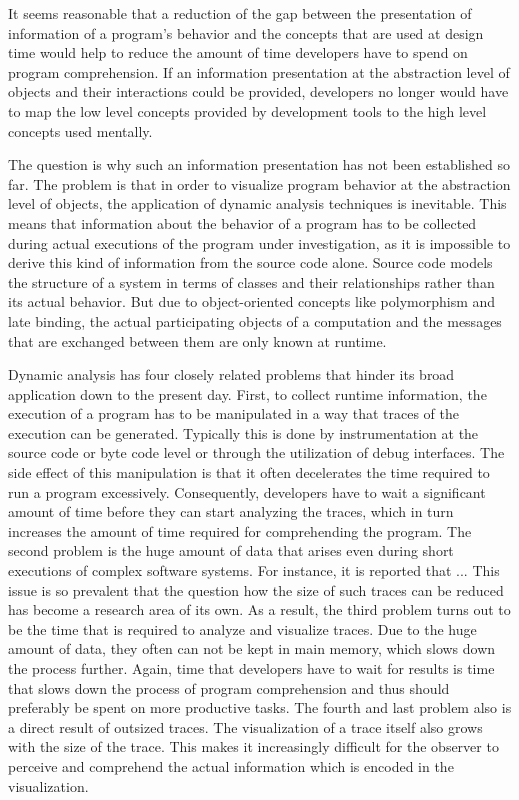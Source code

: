 It seems reasonable that a reduction of the gap between the presentation of information of a program's behavior and the concepts that are used at design time would help to reduce the amount of time developers have to spend on program comprehension.
If an information presentation at the abstraction level of objects and their interactions could be provided, developers no longer would have to map the low level concepts provided by development tools to the high level concepts used mentally.

The question is why such an information presentation has not been established so far.
The problem is that in order to visualize program behavior at the abstraction level of objects, the application of dynamic analysis techniques is inevitable.
This means that information about the behavior of a program has to be collected during actual executions of the program under investigation, as it is impossible to derive this kind of information from the source code alone.
Source code models the structure of a system in terms of classes and their relationships rather than its actual behavior.
But due to object-oriented concepts like polymorphism and late binding, the actual participating objects of a computation and the messages that are exchanged between them are only known at runtime.

Dynamic analysis has four closely related problems that hinder its broad application down to the present day.
First, to collect runtime information, the execution of a program has to be manipulated in a way that traces of the execution can be generated.
Typically this is done by instrumentation at the source code or byte code level or through the utilization of debug interfaces.
The side effect of this manipulation is that it often decelerates the time required to run a program excessively.
Consequently, developers have to wait a significant amount of time before they can start analyzing the traces, which in turn increases the amount of time required for comprehending the program.
The second problem is the huge amount of data that arises even during short executions of complex software systems.
For instance, it is reported that ...
This issue is so prevalent that the question how the size of such traces can be reduced  has become a research area of its own.
As a result, the third problem turns out to be the time that is required to analyze and visualize traces.
Due to the huge amount of data, they often can not be kept in main memory, which slows down the process further.
Again, time that developers have to wait for results is time that slows down the process of program comprehension and thus should preferably be spent on more productive tasks.
The fourth and last problem also is a direct result of outsized traces.
The visualization of a trace itself also grows with the size of the trace.
This makes it increasingly difficult for the observer to perceive and comprehend the actual information which is encoded in the visualization.

